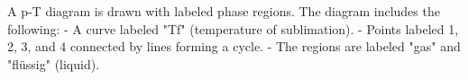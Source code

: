 A p-T diagram is drawn with labeled phase regions. The diagram includes the following:  
- A curve labeled "Tf" (temperature of sublimation).  
- Points labeled 1, 2, 3, and 4 connected by lines forming a cycle.  
- The regions are labeled "gas" and "flüssig" (liquid).